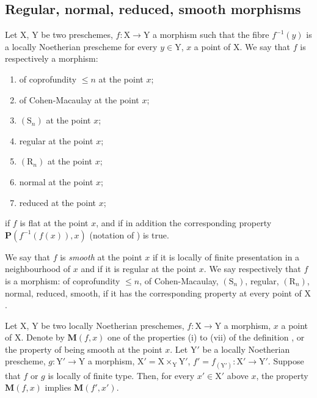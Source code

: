 \subsection{Regular, normal, reduced, smooth morphisms}
\label{subsection:IV.6.8}


\begin{definition}[6.8.1]
\label{IV.6.8.1}
Let $\mathrm{X}$, $\mathrm{Y}$ be two preschemes, $f:\mathrm{X}\to\mathrm{Y}$ a morphism such that the fibre $f^{-1}(y)$ is a locally Noetherian prescheme for every $y\in\mathrm{Y}$, $x$ a point of $\mathrm{X}$. We say that $f$ is respectively a morphism:
\begin{enumerate}[label=(\roman*)]
  \item of coprofundity $\leqslant n$ at the point $x$;
  \item of Cohen-Macaulay at the point $x$;
  \item $(\mathrm{S}_n)$ at the point $x$;
  \item regular at the point $x$;
  \item $(\mathrm{R}_n)$ at the point $x$;
  \item normal at the point $x$;
  \item reduced at the point $x$;
\end{enumerate}
if $f$ is flat at the point $x$, and if in addition the corresponding property $\boldsymbol{P}(f^{-1}(f(x)),x)$ \textnormal{(}notation of \textnormal{)} is true.

We say that $f$ is \emph{smooth} at the point $x$ if it is locally of finite presentation in a neighbourhood of $x$ and if it is regular at the point $x$. We say respectively that $f$ is a morphism: of coprofundity $\leqslant n$, of Cohen-Macaulay, $(\mathrm{S}_n)$, regular, $(\mathrm{R}_n)$, normal, reduced, smooth, if it has the corresponding property at every point of $\mathrm{X}$.
\end{definition}

\begin{proposition}[6.8.2]
\label{IV.6.8.2}
Let $\mathrm{X}$, $\mathrm{Y}$ be two locally Noetherian preschemes, $f:\mathrm{X}\to\mathrm{Y}$ a morphism, $x$ a point of $\mathrm{X}$. Denote by $\boldsymbol{M}(f,x)$ one of the properties (i) to (vii) of the definition , or the property of being smooth at the point $x$. Let $\mathrm{Y}'$ be a locally Noetherian prescheme, $g:\mathrm{Y}'\to\mathrm{Y}$ a morphism, $\mathrm{X}'=\mathrm{X}\times_\mathrm{Y}\mathrm{Y}'$, $f'=f_{(\mathrm{Y}')}:\mathrm{X}'\to\mathrm{Y}'$. Suppose that $f$ or $g$ is locally of finite type. Then, for every $x'\in\mathrm{X}'$ above $x$, the property $\boldsymbol{M}(f,x)$ implies $\boldsymbol{M}(f',x')$.
\end{proposition}

